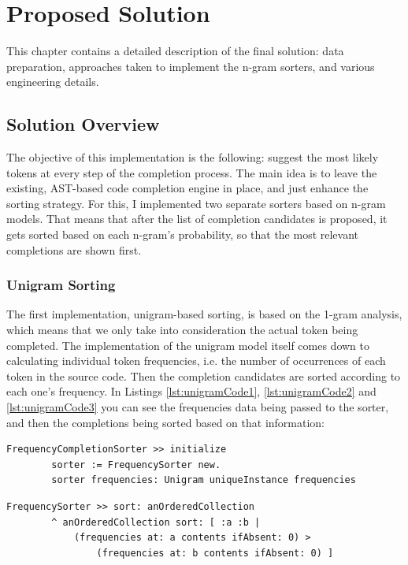 \chapter{Proposed Solution}
\label{chap:ProposedSolution}

This chapter contains a detailed description of the final solution: data preparation, approaches taken to implement the n-gram sorters, and various engineering details.

\section{Solution Overview}
\label{sec:ProposedSolution-Overview}
The objective of this implementation is the following: suggest the most likely tokens at every step of the completion process. The main idea is to leave the existing, AST-based code completion engine in place, and just enhance the sorting strategy. For this, I implemented two separate sorters based on n-gram models. That means that after the list of completion candidates is proposed, it gets sorted based on each n-gram's probability, so that the most relevant completions are shown first.

\subsection{Unigram Sorting}
The first implementation, unigram-based sorting, is based on the 1-gram analysis, which means that we only take into consideration the actual token being completed. The implementation of the unigram model itself comes down to calculating individual token frequencies, i.e. the number of occurrences of each token in the source code. Then the completion candidates are sorted according to each one's frequency. In Listings \ref{lst:unigramCode1}, \ref{lst:unigramCode2} and \ref{lst:unigramCode3}  you can see the frequencies data being passed to the sorter, and then the completions being sorted based on that information:

\begin{lstlisting}[caption={The unigram sorter implementation: passing the frequencies to the sorter}, label={lst:unigramCode1}]
    FrequencyCompletionSorter >> initialize
        sorter := FrequencySorter new.
        sorter frequencies: Unigram uniqueInstance frequencies
\end{lstlisting}

\begin{lstlisting}[caption={The sorter implementation: sorting the candidates according to their frequencies}, label={lst:unigramCode2}]
    FrequencySorter >> sort: anOrderedCollection
        ^ anOrderedCollection sort: [ :a :b |
            (frequencies at: a contents ifAbsent: 0) >
                (frequencies at: b contents ifAbsent: 0) ]
\end{lstlisting}


